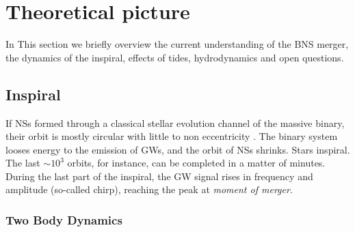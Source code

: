 
\section{Theoretical picture}

In This section we briefly overview the current understanding of the \ac{BNS} 
merger, the dynamics of the inspiral, effects of tides, \pmerg{} hydrodynamics 
and open questions.


\subsection{Inspiral}

If \acp{NS} formed through a classical stellar evolution channel of the massive binary, 
their orbit is mostly circular with little to non eccentricity \cite{4}. 
%
The binary system looses energy to the emission of \acp{GW}, and the orbit of \acp{NS} 
shrinks. Stars inspiral. The last ${\sim}10^3$ orbits, for instance, can be completed in 
a matter of minutes. During the last part of the inspiral, the \ac{GW} signal rises in 
frequency and amplitude (so-called chirp), reaching the peak at \textit{moment of merger}.


\subsubsection{Two Body Dynamics}

